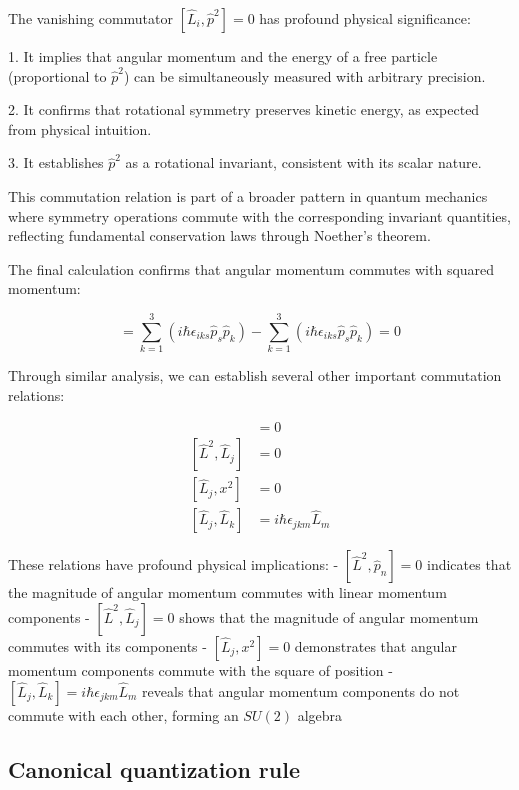 \documentclass[italian]{HKNdocument}
\begin{document}
The vanishing commutator $[\hat{L}_i, \hat{p}^2] = 0$ has profound physical significance:

1. It implies that angular momentum and the energy of a free particle (proportional to $\hat{p}^2$) can be simultaneously measured with arbitrary precision.

2. It confirms that rotational symmetry preserves kinetic energy, as expected from physical intuition.

3. It establishes $\hat{p}^2$ as a rotational invariant, consistent with its scalar nature.

This commutation relation is part of a broader pattern in quantum mechanics where symmetry operations commute with the corresponding invariant quantities, reflecting fundamental conservation laws through Noether's theorem.


The final calculation confirms that angular momentum commutes with squared momentum:

\begin{equation}
[\hat{L}_i, \hat{p}^2] = \sum_{k=1}^{3}(i\hbar\epsilon_{iks}\hat{p}_s\hat{p}_k) - \sum_{k=1}^{3}(i\hbar\epsilon_{iks}\hat{p}_s\hat{p}_k) = 0 \label{eq:1.73}
\end{equation}

Through similar analysis, we can establish several other important commutation relations:

\begin{align}
[\hat{L}^2, \hat{p}_n] &= 0 \\
[\hat{L}^2, \hat{L}_j] &= 0 \\
[\hat{L}_j, x^2] &= 0 \label{eq:1.74} \\
[\hat{L}_j, \hat{L}_k] &= i\hbar\epsilon_{jkm}\hat{L}_m
\end{align}

These relations have profound physical implications:
- $[\hat{L}^2, \hat{p}_n] = 0$ indicates that the magnitude of angular momentum commutes with linear momentum components
- $[\hat{L}^2, \hat{L}_j] = 0$ shows that the magnitude of angular momentum commutes with its components
- $[\hat{L}_j, x^2] = 0$ demonstrates that angular momentum components commute with the square of position
- $[\hat{L}_j, \hat{L}_k] = i\hbar\epsilon_{jkm}\hat{L}_m$ reveals that angular momentum components do not commute with each other, forming an $SU(2)$ algebra

\subsection{Canonical quantization rule}
\end{document}
